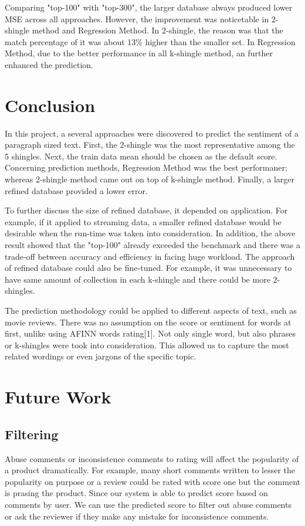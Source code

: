 Comparing "top-100" with "top-300", the larger database always produced lower MSE across all approaches. However, the improvement was noticetable in 2-shingle method and Regression Method. In 2-shingle, the reason was that the match percentage of it was about 13\% higher than the smaller set. In Regression Method, due to the better performance in all k-shingle method, an further enhanced the prediction.


\section{Conclusion}

In this project, a several approaches were discovered to predict the sentiment of a paragraph sized text. First, the 2-shingle was the most representative among the 5 shingles. Next, the train data mean should be chosen as the default score. Concerning prediction methods, Regression Method was the best performaner; whereas 2-shingle method came out on top of k-shingle method. Finally, a larger refined database provided a lower error.

To further discuss the size of refined database, it depended on application. For example, if it applied to streaming data, a smaller refined database would be desirable when the run-time was taken into consideration. In addition, the above result showed that the "top-100" already exceeded the benchmark and there was a trade-off between accuracy and efficiency in facing huge workload. 
The approach of refined database could also be fine-tuned. For example, it was unnecessary to have same amount of collection in each k-shingle and there could be more 2-shingles.

The prediction methodology could be applied to different aspects of text, such as movie reviews. There was no assumption on the score or sentiment for words at first, unlike using AFINN words rating[1]. Not only single word, but also phrases or k-shingles were took into consideration. This allowed us to capture the most related wordings or even jargons of the specific topic.


\section{Future Work}

\subsection{Filtering}
Abuse comments or inconsistence comments to rating will affect the popularity of a product dramatically. For example, many short comments written to lesser the popularity on purpose or a review could be rated with score one but the comment is prasing the product. Since our system is able to predict score based on comments by user. We can use the predicted score to filter out abuse comments or ask the reviewer if they make any mistake for inconsistence comments. 

